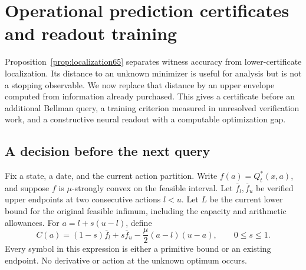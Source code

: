 \section{Operational prediction certificates and readout training}\label{sec:operational67}
Proposition~\ref{prop:localization65} separates witness accuracy from lower-certificate localization. Its distance to an unknown minimizer is useful for analysis but is not a stopping observable. We now replace that distance by an upper envelope computed from information already purchased. This gives a certificate before an additional Bellman query, a training criterion measured in unresolved verification work, and a constructive neural readout with a computable optimization gap.

\subsection{A decision before the next query}
Fix a state, a date, and the current action partition. Write $f(a)=Q_t^*(x,a)$, and suppose $f$ is $\mu$-strongly convex on the feasible interval. Let $\overline f_l,\overline f_u$ be verified upper endpoints at two consecutive actions $l<u$. Let $L$ be the current lower bound for the original feasible infimum, including the capacity and arithmetic allowances. For $a=l+s(u-l)$, define
\begin{equation}\label{eq:screen67}
 C(a)=(1-s)\overline f_l+s\overline f_u
       -\frac\mu2 (a-l)(u-a),\qquad 0\le s\le1.
\end{equation}
Every symbol in this expression is either a primitive bound or an existing endpoint. No derivative or action at the unknown optimum occurs.

